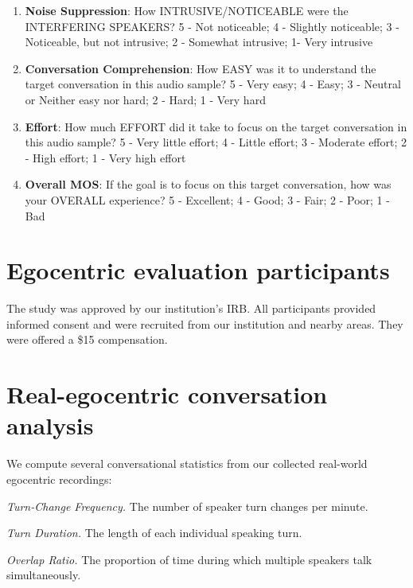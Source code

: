 \begin{enumerate}[label=(\arabic*), leftmargin=*, itemsep=0pt, topsep=0pt]
  \item \textbf{Noise Suppression}: How INTRUSIVE/NOTICEABLE were the INTERFERING SPEAKERS? 5 - Not noticeable; 4 - Slightly noticeable; 3 - Noticeable, but not intrusive; 2 - Somewhat intrusive; 1- Very intrusive

  \item \textbf{Conversation Comprehension}: How EASY was it to understand the target conversation in this audio sample? 5 - Very easy; 4 - Easy; 3 - Neutral or Neither easy nor hard; 2 - Hard; 1 - Very hard

  \item \textbf{Effort}: How much EFFORT did it take to focus on the target conversation in this audio sample? 5 - Very little effort; 4 - Little effort; 3 - Moderate effort; 2 - High effort; 1 - Very high effort

  \item \textbf{Overall MOS}: If the goal is to focus on this target conversation, how was your OVERALL experience? 5 - Excellent; 4 - Good; 3 - Fair; 2 - Poor; 1 - Bad
\end{enumerate}

\section{Egocentric evaluation participants}
The study was approved by our institution's IRB. All participants provided informed consent and were recruited from our institution and nearby areas. They were offered a \$15 compensation. %



\section{Real-egocentric conversation analysis}

We compute several conversational statistics from our collected real-world egocentric recordings:
\squishlist
\item {\it Turn-Change Frequency.} The number of speaker turn changes per minute.

 \item {\it Turn Duration.} The length of each individual speaking turn.

 \item  {\it Overlap Ratio.} The proportion of time during which multiple speakers talk simultaneously.

